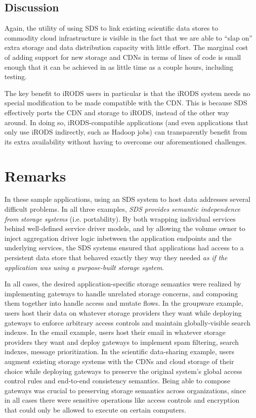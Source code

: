 \subsection{Discussion}

Again, the utility of using SDS to link existing scientific data stores to
commodity cloud infrastructure is visible in the fact that we are able to ``slap
on'' extra storage and data distribution capacity with little effort.  The
marginal cost of adding support for new storage and CDNs in terms of lines of
code is small enough that it can be achieved in as little time as a couple
hours, including testing.

The key benefit to iRODS users in particular is that the iRODS system needs no
special modification to be made compatible with the CDN.  This is because
SDS effectively ports the CDN and storage to iRODS, instead of the other way around.
In doing so, iRODS-compatible applications (and even applications that only use
iRODS indirectly, such as Hadoop jobs) can transparently benefit from its extra
availability without having to overcome our aforementioned challenges.

\section{Remarks}

In these sample applications, using an SDS system to host data addresses
several difficult problems.  In all three examples, 
\emph{SDS provides semantic independence from storage systems} (i.e.
portability).  By both wrapping individual services behind well-defined service driver models, and by
allowing the volume owner to inject aggregation driver logic inbetween the
application endpoints and the underlying services, the SDS systems ensured that applications
had access to a persistent data store that behaved exactly they way they needed
\emph{as if the application was using a purpose-built storage system}.

In all cases, the desired application-specific storage semantics were realized
by implementing gateways to handle unrelated storage concerns, and composing them
together into handle access and mutate flows.
In the groupware example, users host their data on whatever storage providers they want
while deploying gateways to enforce arbitrary access controls and maintain globally-visible search
indexes.  In the email example, users host
their email in whatever storage providers they want and deploy gateways to
implement spam filtering, search indexes, message prioritization.  In the scientific
data-sharing example, users augment existing storage systems with the CDNs and cloud
storage of their choice while deploying gateways to preserve the original system's global access
control rules and end-to-end consistency semantics.  Being able to compose
gateways was crucial to preserving storage semantics across organizations, since
in all cases there were sensitive operations like access controls and encryption
that could only be allowed to execute on certain computers.

